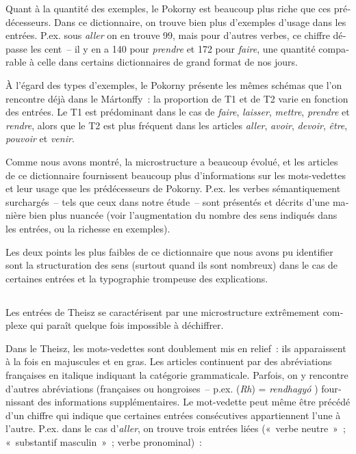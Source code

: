 \documentclass[output=paper,colorlinks,citecolor=brown,arabicfont,chinesefont,booklanguage=french]{langscibook}
\begin{document}
\begin{otherlanguage}{french}
Quant à la quantité des exemples, le Pokorny est beaucoup plus riche que ces prédécesseurs. Dans ce dictionnaire, on trouve bien plus d’exemples d’usage dans les entrées. P.ex. sous \emph{aller} on en trouve 99, mais pour d’autres verbes, ce chiffre dépasse les cent~-- il y en a 140 pour \emph{prendre} et 172 pour \emph{faire}, une quantité comparable à celle dans certains dictionnaires de grand format de nos jours. 

À l’égard des types d’exemples, le Pokorny présente les mêmes schémas que l’on rencontre déjà dans le Mártonffy~: la proportion de T1 et de T2 varie en fonction des entrées. Le T1 est prédominant dans le cas de \emph{faire}, \emph{laisser}, \emph{mettre}, \emph{prendre} et \emph{rendre}, alors que le T2 est plus fréquent dans les articles \emph{aller}, \emph{avoir}, \emph{devoir}, \emph{être}, \emph{pouvoir} et \emph{venir}.

Comme nous avons montré, la microstructure a beaucoup évolué, et les articles de ce dictionnaire fournissent beaucoup plus d’informations sur les mots-vedettes et leur usage que les prédécesseurs de Pokorny. P.ex. les verbes sémantiquement surchargés~-- tels que ceux dans notre étude~-- sont présentés et décrits d’une manière bien plus nuancée (voir l’augmentation du nombre des sens indiqués dans les entrées, ou la richesse en exemples). 

Les deux points les plus faibles de ce dictionnaire que nous avons pu identifier sont la structuration des sens (surtout quand ils sont nombreux) dans le cas de certaines entrées et la typographie trompeuse des explications.

\subsection{\citealt{Theisz1902} }\label{sec:tillinger:3.5}
\largerpage
Les entrées de Theisz se caractérisent par une microstructure extrêmement complexe qui paraît quelque fois impossible à déchiffrer. 

Dans le Theisz, les mots-vedettes sont doublement mis en relief~: ils apparaissent à la fois en majuscules et en gras. Les articles continuent par des abréviations françaises en italique indiquant la catégorie grammaticale. Parfois, on y rencontre d’autres abréviations (françaises ou hongroises~-- p.ex. (\emph{Rh}) = \emph{rendhagyó} ) fournissant des informations supplémentaires. Le mot-vedette peut même être précédé d’un chiffre qui indique que certaines entrées consécutives appartiennent l’une à l’autre. P.ex. dans le cas d’\emph{aller}, on trouve trois entrées liées («~verbe neutre~»~; «~substantif masculin~»~; verbe pronominal)~:


\end{otherlanguage}
\end{document}

